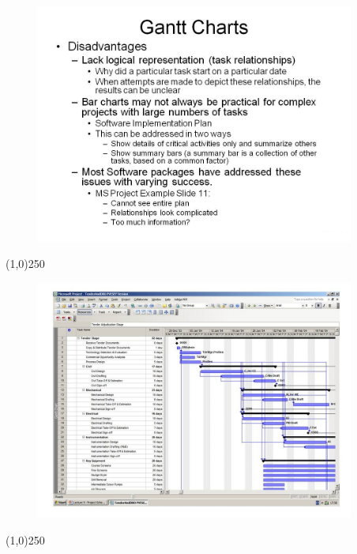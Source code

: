 \begin{frame}
\begin{figure}
	\centering
		\includegraphics[width = 10.5cm]{oldnotes/Slide41.jpg}
\end{figure}
\end{frame}
\begin{center}\line(1,0){250}\end{center}





\begin{frame}
\begin{figure}
	\centering
		\includegraphics[width = 10.5cm]{oldnotes/Slide42.jpg}
\end{figure}
\end{frame}
\begin{center}\line(1,0){250}\end{center}





